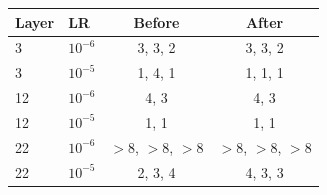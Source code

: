 \begin{tabular}{llcc}
\toprule
Layer & LR & Before & After \\
\midrule
3 & $10^{-6}$ & 3, 3, 2 & 3, 3, 2 \\
3 & $10^{-5}$ & 1, 4, 1 & 1, 1, 1 \\
12 & $10^{-6}$ & 4, 3 & 4, 3 \\
12 & $10^{-5}$ & 1, 1 & 1, 1 \\
22 & $10^{-6}$ & $>8$, $>8$, $>8$ & $>8$, $>8$, $>8$ \\
22 & $10^{-5}$ & 2, 3, 4 & 4, 3, 3 \\
\bottomrule
\end{tabular}
